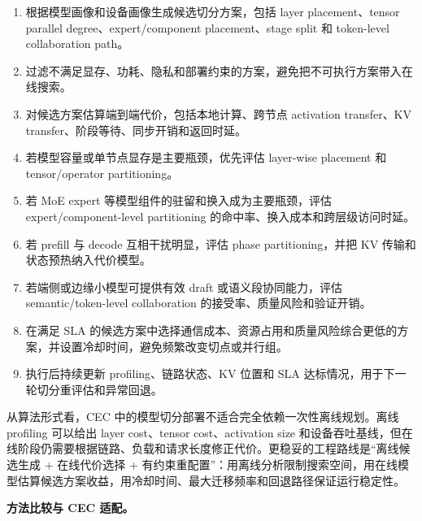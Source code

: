 \documentclass[a4paper,twocolumn,10pt]{ctexart}
\begin{document}
\begin{enumerate}
\item 根据模型画像和设备画像生成候选切分方案，包括 layer placement、tensor parallel degree、expert/component placement、stage split 和 token-level collaboration path。

\item 过滤不满足显存、功耗、隐私和部署约束的方案，避免把不可执行方案带入在线搜索。

\item 对候选方案估算端到端代价，包括本地计算、跨节点 activation transfer、KV transfer、阶段等待、同步开销和返回时延。

\item 若模型容量或单节点显存是主要瓶颈，优先评估 layer-wise placement 和 tensor/operator partitioning。

\item 若 MoE expert 等模型组件的驻留和换入成为主要瓶颈，评估 expert/component-level partitioning 的命中率、换入成本和跨层级访问时延。

\item 若 prefill 与 decode 互相干扰明显，评估 phase partitioning，并把 KV 传输和状态预热纳入代价模型。

\item 若端侧或边缘小模型可提供有效 draft 或语义段协同能力，评估 semantic/token-level collaboration 的接受率、质量风险和验证开销。

\item 在满足 SLA 的候选方案中选择通信成本、资源占用和质量风险综合更低的方案，并设置冷却时间，避免频繁改变切点或并行组。

\item 执行后持续更新 profiling、链路状态、KV 位置和 SLA 达标情况，用于下一轮切分重评估和异常回退。

\end{enumerate}
从算法形式看，CEC 中的模型切分部署不适合完全依赖一次性离线规划。离线 profiling 可以给出 layer cost、tensor cost、activation size 和设备吞吐基线，但在线阶段仍需要根据链路、负载和请求长度修正代价。更稳妥的工程路线是“离线候选生成 + 在线代价选择 + 有约束重配置”：用离线分析限制搜索空间，用在线模型估算候选方案收益，用冷却时间、最大迁移频率和回退路径保证运行稳定性。


\textbf{方法比较与 CEC 适配。}
\end{document}
